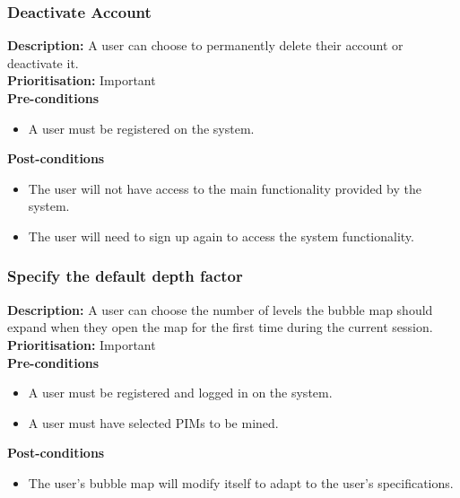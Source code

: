\documentclass[hidelinks,english]{article}
\begin{document}
    		\subsubsection{Deactivate Account}
				\textbf{Description:}  A user can choose to permanently delete their account or deactivate it.\\
    			\textbf{Prioritisation:} Important\\
      			\textbf{Pre-conditions}
    			\begin{itemize}
        			\item A user must be registered on the system.
    			\end{itemize}
    			\textbf{Post-conditions}
     			\begin{itemize}
        			\item The user will not have access to the main functionality provided by the system.
        			\item The user will need to sign up again to access the system functionality.
    			\end{itemize}
    			
			    
    		\subsubsection{Specify the default depth factor}
				\textbf{Description:}  A user can choose the number of levels the bubble map should expand when they open the map for the first time during the current session.\\
			    \textbf{Prioritisation:} Important\\
      			\textbf{Pre-conditions}
			    \begin{itemize}
			        \item A user must be registered and logged in on the system.
			        \item A user must have selected PIMs to be mined.
			    \end{itemize}
    			\textbf{Post-conditions}
     			\begin{itemize}
        			\item The user's bubble map will modify itself to adapt to the user's specifications.
    			\end{itemize}
    			
\end{document}
